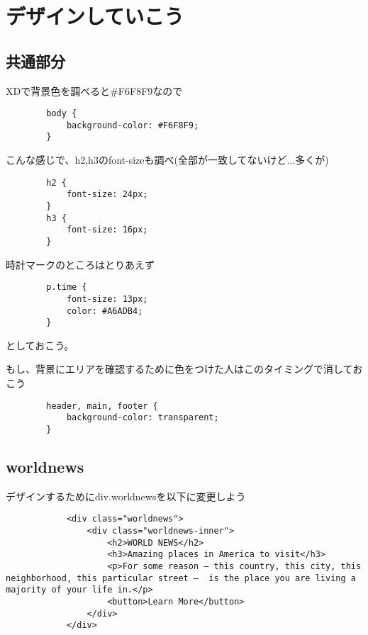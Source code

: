 \documentclass[mingoth,11pt,a4j,uplatex,dvipdfmx]{jsarticle}
\begin{document}
\section{デザインしていこう}
\subsection{共通部分}
XDで背景色を調べると\#F6F8F9なので

\begin{lstlisting}
        body {
            background-color: #F6F8F9;
        }
\end{lstlisting}

こんな感じで、h2,h3のfont-sizeも調べ(全部が一致してないけど...多くが)

\begin{lstlisting}
        h2 {
            font-size: 24px;
        }
        h3 {
            font-size: 16px;
        }
\end{lstlisting}

時計マークのところはとりあえず

\begin{lstlisting}
        p.time {
            font-size: 13px;
            color: #A6ADB4;
        }
\end{lstlisting}

としておこう。

もし、背景にエリアを確認するために色をつけた人はこのタイミングで消しておこう

\begin{lstlisting}
        header, main, footer {
            background-color: transparent;
        }
\end{lstlisting}

\subsection{worldnews}
デザインするためにdiv.worldnewsを以下に変更しよう

\begin{lstlisting}
            <div class="worldnews">
                <div class="worldnews-inner">
                    <h2>WORLD NEWS</h2>
                    <h3>Amazing places in America to visit</h3>
                    <p>For some reason — this country, this city, this neighborhood, this particular street —  is the place you are living a majority of your life in.</p>
                    <button>Learn More</button>
                </div>
            </div>
\end{lstlisting}
\end{document}
